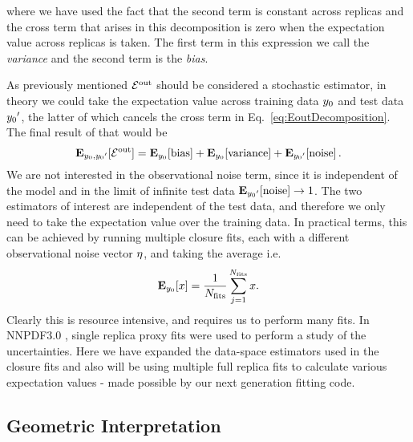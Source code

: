 where we have used the fact that the second term is constant across replicas and
the cross term that arises in this decomposition is zero when the expectation
value across replicas is taken. The first term in this expression we call the
{\em variance} and the second term is the {\em bias}.

As previously mentioned $\mathcal{E}^{\rm out}$ should be considered a stochastic estimator, in
theory we could take the expectation value across training data $y_0$
and test data ${{y_0}^{\prime}}$, the latter of which cancels the cross
term in Eq.~\ref{eq:EoutDecomposition}. The final result of that would be
\begin{equation}\label{eq:ExpectedBiasVariance}
    \mathbf{E}_{y_0, {{y_0}^{\prime}}}[\mathcal{E}^{\rm out}] =
    \mathbf{E}_{y_0}[{\rm bias}] + 
    \mathbf{E}_{y_0}[{\rm variance}] +
    \mathbf{E}_{{{y_0}^{\prime}}}[{\rm noise}]\, .
\end{equation}
We are not interested in the observational noise term, since it is independent
of the model and in the limit of infinite test data
$\mathbf{E}_{{{y_0}^{\prime}}}[{\rm noise}] \to 1$. The two estimators of
interest are independent of the test data, and therefore we only need to take
the expectation value over the training data. In practical terms, this can be
achieved by running multiple closure fits, each with a different observational
noise vector $\eta$, and taking the average i.e.
\begin{equation}
    \label{eq:average_over_training_data}
    \mathbf{E}_{y_0}[ x ] = \frac{1}{N_{\rm fits}} \sum_{j=1}^{N_{\rm fits}} x.
\end{equation}
Clearly this is resource intensive, and requires us to perform many fits. In
NNPDF3.0 \cite{nnpdf30}, single replica proxy fits were used to perform a study
of the uncertainties. Here we have expanded the data-space estimators used in
the closure fits and also will be using multiple full replica fits to calculate
various expectation values - made possible by our next generation fitting code.

\subsection{Geometric Interpretation}

